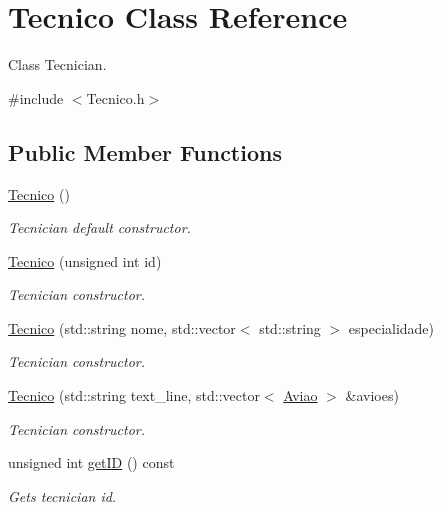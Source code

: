 \hypertarget{class_tecnico}{}\section{Tecnico Class Reference}
\label{class_tecnico}


Class Tecnician.  




{\ttfamily \#include $<$Tecnico.\+h$>$}

\subsection*{Public Member Functions}
\begin{DoxyCompactItemize}
\item 
\mbox{\label{class_tecnico_a55698f063f7f301fd7a7d05f23787ad2}} 
\hyperlink{class_tecnico_a55698f063f7f301fd7a7d05f23787ad2}{Tecnico} ()
\begin{DoxyCompactList}\small\item\em Tecnician default constructor. \end{DoxyCompactList}\item 
\hyperlink{class_tecnico_a9b95e22f7d9328c22ea0e37faf459058}{Tecnico} (unsigned int id)
\begin{DoxyCompactList}\small\item\em Tecnician constructor. \end{DoxyCompactList}\item 
\hyperlink{class_tecnico_aa6f0757f826239296ab9286149494c1f}{Tecnico} (std\+::string nome, std\+::vector$<$ std\+::string $>$ especialidade)
\begin{DoxyCompactList}\small\item\em Tecnician constructor. \end{DoxyCompactList}\item 
\hyperlink{class_tecnico_a34c9eb9a3a60926081f1023daaa19754}{Tecnico} (std\+::string text\+\_\+line, std\+::vector$<$ \hyperlink{class_aviao}{Aviao} $>$ \&avioes)
\begin{DoxyCompactList}\small\item\em Tecnician constructor. \end{DoxyCompactList}\item 
unsigned int \hyperlink{class_tecnico_ac83d463f1f27671e9dc64045eb841644}{get\+ID} () const
\begin{DoxyCompactList}\small\item\em Gets tecnician id. \end{DoxyCompactList}\item 

\end{DoxyCompactItemize}
